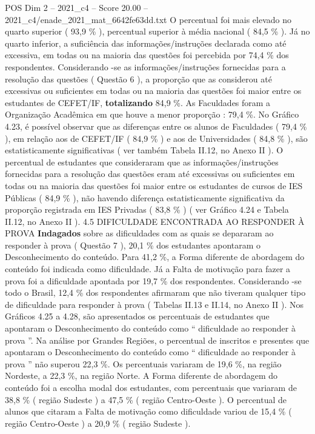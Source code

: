 \begin{textsample}{POS Dim 2 – 2021\_c4 – Score 20.00 – 2021\_c4/enade\_2021\_mat\_6642fe63dd.txt}
O percentual foi mais elevado no quarto superior ( 93,9 \% ), percentual superior à média nacional ( 84,5 \% ).
Já no quarto inferior, a suficiência das informações/instruções declarada como até excessiva, em todas ou na maioria das questões foi percebida por 74,4 \% dos respondentes.
Considerando -se as informações/instruções fornecidas para a resolução das questões ( Questão 6 ), a proporção que as considerou até excessivas ou suficientes em todas ou na maioria das questões foi maior entre os estudantes de CEFET/IF, \textbf{totalizando} 84,9 \%.
As Faculdades foram a Organização Acadêmica em que houve a menor proporção : 79,4 \%.
No Gráfico 4.23, é possível observar que as diferenças entre os alunos de Faculdades ( 79,4 \% ), em relação aos de CEFET/IF ( 84,9 \% ) e aos de Universidades ( 84,8 \% ), são estatisticamente significativas ( ver também Tabela II.12, no Anexo II ).
O percentual de estudantes que consideraram que as informações/instruções fornecidas para a resolução das questões eram até excessivas ou suficientes em todas ou na maioria das questões foi maior entre os estudantes de cursos de IES Públicas ( 84,9 \% ), não havendo diferença estatisticamente significativa da proporção registrada em IES Privadas ( 83,8 \% ) ( ver Gráfico 4.24 e Tabela II.12, no Anexo II ). 4.5 DIFICULDADE ENCONTRADA AO RESPONDER À PROVA \textbf{Indagados} sobre as dificuldades com as quais se depararam ao responder à prova ( Questão 7 ), 20,1 \% dos estudantes apontaram o Desconhecimento do conteúdo.
Para 41,2 \%, a Forma diferente de abordagem do conteúdo foi indicada como dificuldade.
Já a Falta de motivação para fazer a prova foi a dificuldade apontada por 19,7 \% dos respondentes.
Considerando -se todo o Brasil, 12,4 \% dos respondentes afirmaram que não tiveram qualquer tipo de dificuldade para responder à prova ( Tabelas II.13 e II.14, no Anexo II ).
Nos Gráficos 4.25 a 4.28, são apresentados os percentuais de estudantes que apontaram o Desconhecimento do conteúdo como “ dificuldade ao responder à prova ”.
Na análise por Grandes Regiões, o percentual de inscritos e presentes que apontaram o Desconhecimento do conteúdo como “ dificuldade ao responder à prova ” não superou 22,3 \%.
Os percentuais variaram de 19,6 \%, na região Nordeste, a 22,3 \%, na região Norte.
A Forma diferente de abordagem do conteúdo foi a escolha modal dos estudantes, com percentuais que variaram de 38,8 \% ( região Sudeste ) a 47,5 \% ( região Centro-Oeste ).
O percentual de alunos que citaram a Falta de motivação como dificuldade variou de 15,4 \% ( região Centro-Oeste ) a 20,9 \% ( região Sudeste ).

\end{textsample}
